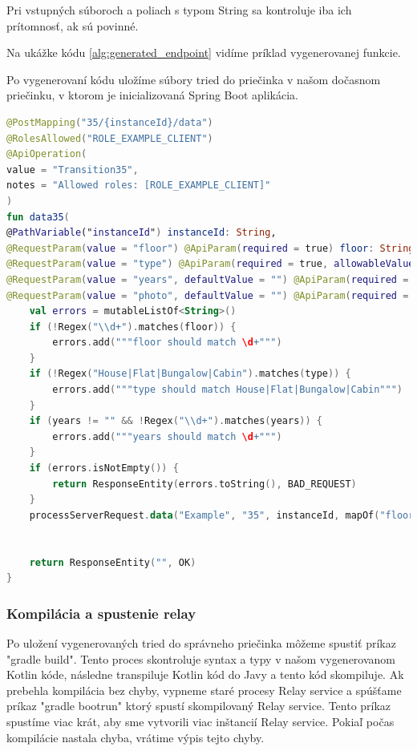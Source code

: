 Pri vstupných súboroch a poliach s typom String sa kontroluje iba ich prítomnosť, ak sú povinné.

Na ukážke kódu \ref{alg:generated_endpoint} vidíme príklad vygenerovanej funkcie.

Po vygenerovaní kódu uložíme súbory tried do priečinka v našom dočasnom priečinku, v ktorom je inicializovaná Spring Boot aplikácia.

\begin{lstlisting}[float, caption={Príklad vygenerovanej funkcie},label={alg:generated_endpoint},language=Kotlin]
@PostMapping("35/{instanceId}/data")
@RolesAllowed("ROLE_EXAMPLE_CLIENT")
@ApiOperation(
value = "Transition35",
notes = "Allowed roles: [ROLE_EXAMPLE_CLIENT]"
)
fun data35(
@PathVariable("instanceId") instanceId: String,
@RequestParam(value = "floor") @ApiParam(required = true) floor: String,
@RequestParam(value = "type") @ApiParam(required = true, allowableValues = """[House, Flat, Bungalow, Cabin]""") type: String,
@RequestParam(value = "years", defaultValue = "") @ApiParam(required = false) years: String,
@RequestParam(value = "photo", defaultValue = "") @ApiParam(required = false) photo: MultipartFile ): ResponseEntity<String> {
	val errors = mutableListOf<String>()
	if (!Regex("\\d+").matches(floor)) {
		errors.add("""floor should match \d+""")
	}
	if (!Regex("House|Flat|Bungalow|Cabin").matches(type)) {
		errors.add("""type should match House|Flat|Bungalow|Cabin""")
	}
	if (years != "" && !Regex("\\d+").matches(years)) {
		errors.add("""years should match \d+""")
	}
	if (errors.isNotEmpty()) {
		return ResponseEntity(errors.toString(), BAD_REQUEST)
	}
	processServerRequest.data("Example", "35", instanceId, mapOf("floor" to floor, "type" to type, "years" to years, "photo" to photo ))
	

	return ResponseEntity("", OK)
}
\end{lstlisting}

\subsubsection{Kompilácia a spustenie relay}

Po uložení vygenerovaných tried do správneho priečinka môžeme spustiť príkaz "gradle build". Tento proces skontroluje syntax a typy v našom vygenerovanom Kotlin kóde, následne transpiluje Kotlin kód do Javy a tento kód skompiluje. Ak prebehla kompilácia bez chyby, vypneme staré procesy Relay service a spúšťame príkaz "gradle bootrun" ktorý spustí skompilovaný Relay service. Tento príkaz spustíme viac krát, aby sme vytvorili viac inštancií Relay service. Pokiaľ počas kompilácie nastala chyba, vrátime výpis tejto chyby.

